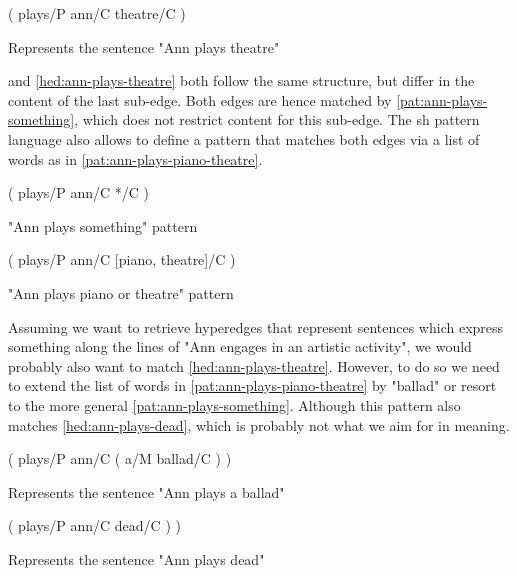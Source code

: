 \documentclass[11pt]{scrreprt}
\begin{document}
\begin{hedge}[h!]
  \normalfont\sffamily
  \centering
  ( plays/P ann/C theatre/C ) 
  \caption{Represents the sentence "Ann plays theatre"}
  \label{hed:ann-plays-theatre}
\end{hedge}
  


 and \cref{hed:ann-plays-theatre} both follow the same structure, but differ in the content of the last sub-edge. Both edges are hence matched by \cref{pat:ann-plays-something}, which does not restrict content for this sub-edge. The \gls{sh} pattern language also allows to define a pattern that matches both edges via a list of words as in \cref{pat:ann-plays-piano-theatre}. 

\begin{pattern}[h!]
  \normalfont\sffamily
  \centering
  ( plays/P ann/C */C )
  \caption{"Ann plays something" pattern}
  \label{pat:ann-plays-something}
\end{pattern}

\begin{pattern}[h!]
  \normalfont\sffamily
  \centering
  ( plays/P ann/C [piano, theatre]/C )
  \caption{"Ann plays piano or theatre" pattern}
  \label{pat:ann-plays-piano-theatre}
\end{pattern}

Assuming we want to retrieve hyperedges that represent sentences which express something along the lines of "Ann engages in an artistic activity", we would probably also want to match \cref{hed:ann-plays-theatre}. However, to do so we need to extend the list of words in \cref{pat:ann-plays-piano-theatre} by "ballad" or resort to the more general \cref{pat:ann-plays-something}. Although this pattern also matches \cref{hed:ann-plays-dead}, which is probably not what we aim for in meaning. 

\begin{hedge}[h!]
  \normalfont\sffamily
  \centering
  ( plays/P ann/C ( a/M ballad/C ) ) 
  \caption{Represents the sentence "Ann plays a ballad"}
  \label{hed:ann-plays-ballad}
\end{hedge}

\begin{hedge}[h!]
  \normalfont\sffamily
  \centering
   ( plays/P ann/C dead/C ) )
  \caption{Represents the sentence "Ann plays dead"}
  \label{hed:ann-plays-dead}
\end{hedge}

%
\end{document}
